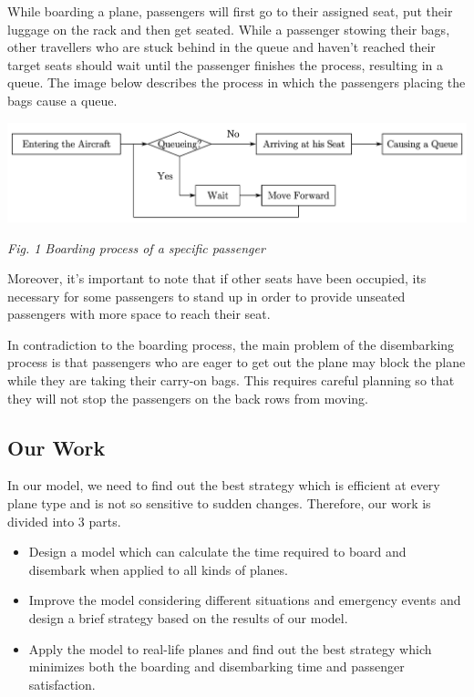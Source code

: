 \documentclass{article}
\theoremstyle{definition}
\theoremstyle{remark}
\numberwithin{equation}{section}
\begin{document}
	While boarding a plane, passengers will first go to their assigned seat, put their luggage on the rack and then get seated. While a passenger stowing their bags, other travellers who are stuck behind in the queue and haven't reached their target seats should wait until the passenger finishes the process, resulting in a queue. The image below describes the process in which the passengers placing the bags cause a queue.


	\begin{center}
		\includegraphics[width=14cm]{chart.jpg}

		\textit{Fig. 1 Boarding process of a specific passenger}
	\end{center}

	Moreover, it's important to note that if other seats have been occupied, its necessary for some passengers to stand up in order to provide unseated passengers with more space to reach their seat.

	In contradiction to the boarding process, the main problem of the disembarking process is that passengers who are eager to get out the plane may block the plane while they are taking their carry-on bags. This requires careful planning so that they will not stop the passengers on the back rows from moving.
	\subsection{Our Work}
	In our model, we need to find out the best strategy which is efficient at every plane type and is not so sensitive to sudden changes. Therefore, our work is divided into 3 parts.
	\begin{itemize}
		\item Design a model which can calculate the time required to board and disembark when applied to all kinds of planes.
		\item Improve the model considering different situations and emergency events and design a brief strategy based on the results of our model.
		\item Apply the model to real-life planes and find out the best strategy which minimizes both the boarding and disembarking time and passenger satisfaction.
	\end{itemize}
\end{document}
